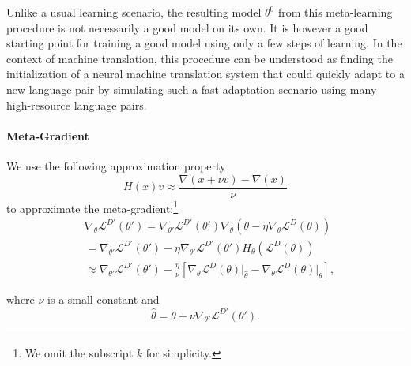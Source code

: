 Unlike a usual learning scenario, the resulting model $\theta^0$ from this meta-learning procedure is not necessarily a good model on its own. It is however a good starting point for training a good model using only a few steps of learning. In the context of machine translation, this procedure can be understood as finding the initialization of a neural machine translation system that could quickly adapt to a new language pair by simulating such a fast adaptation scenario using many high-resource language pairs. 



\paragraph{Meta-Gradient}

We use the following approximation property 
\begin{equation}
H(x)v \approx \frac{\nabla(x+\nu v) - \nabla(x)}{\nu}
\end{equation}
to approximate the meta-gradient:\footnote{We omit the subscript $k$ for simplicity.}
\begin{equation}
\begin{split}
	  &\nabla_\theta  \mathcal{L}^{D'}(\theta') = \nabla_{\theta'} \mathcal{L}^{D'}(\theta') 
    \nabla_{\theta}(\theta - \eta \nabla_{\theta} \mathcal{L}^{D}(\theta)) \\
    &= \nabla_{\theta'} \mathcal{L}^{D'}(\theta')
    - \eta \nabla_{\theta'} \mathcal{L}^{D'}(\theta') H_{\theta}(\mathcal{L}^{D}(\theta)) \\
    &\approx 
    \nabla_{\theta'} \mathcal{L}^{D'}(\theta')
    - \frac{\eta}{\nu} \left[
    \nabla_{\theta}\mathcal{L}^D(\theta)\bigg|_{\hat{\theta}}
    - \nabla_{\theta}\mathcal{L}^D(\theta)\bigg|_{\theta} 
    \right],
\end{split}
\end{equation}

where $\nu$ is a small constant and 
\begin{equation}
	\hat{\theta} = \theta + \nu \nabla_{\theta'}\mathcal{L}^{D'}(\theta').	
\end{equation}


